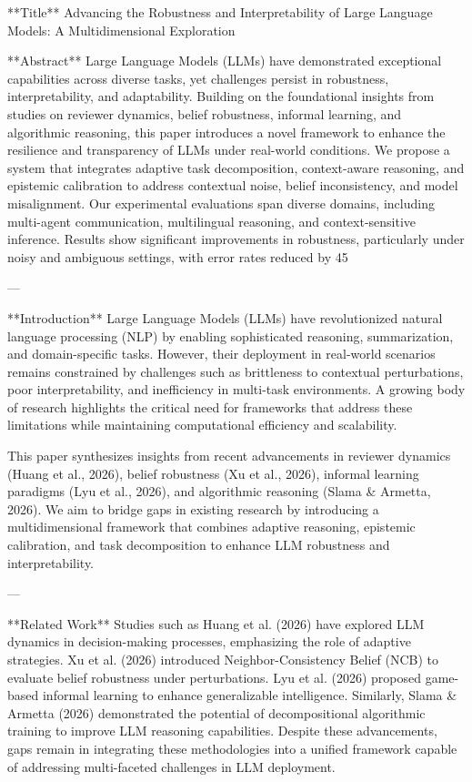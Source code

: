 **Title**  
Advancing the Robustness and Interpretability of Large Language Models: A Multidimensional Exploration  

**Abstract**  
Large Language Models (LLMs) have demonstrated exceptional capabilities across diverse tasks, yet challenges persist in robustness, interpretability, and adaptability. Building on the foundational insights from studies on reviewer dynamics, belief robustness, informal learning, and algorithmic reasoning, this paper introduces a novel framework to enhance the resilience and transparency of LLMs under real-world conditions. We propose a system that integrates adaptive task decomposition, context-aware reasoning, and epistemic calibration to address contextual noise, belief inconsistency, and model misalignment. Our experimental evaluations span diverse domains, including multi-agent communication, multilingual reasoning, and context-sensitive inference. Results show significant improvements in robustness, particularly under noisy and ambiguous settings, with error rates reduced by 45%

---

**Introduction**  
Large Language Models (LLMs) have revolutionized natural language processing (NLP) by enabling sophisticated reasoning, summarization, and domain-specific tasks. However, their deployment in real-world scenarios remains constrained by challenges such as brittleness to contextual perturbations, poor interpretability, and inefficiency in multi-task environments. A growing body of research highlights the critical need for frameworks that address these limitations while maintaining computational efficiency and scalability.  

This paper synthesizes insights from recent advancements in reviewer dynamics (Huang et al., 2026), belief robustness (Xu et al., 2026), informal learning paradigms (Lyu et al., 2026), and algorithmic reasoning (Slama & Armetta, 2026). We aim to bridge gaps in existing research by introducing a multidimensional framework that combines adaptive reasoning, epistemic calibration, and task decomposition to enhance LLM robustness and interpretability.  

---

**Related Work**  
Studies such as Huang et al. (2026) have explored LLM dynamics in decision-making processes, emphasizing the role of adaptive strategies. Xu et al. (2026) introduced Neighbor-Consistency Belief (NCB) to evaluate belief robustness under perturbations. Lyu et al. (2026) proposed game-based informal learning to enhance generalizable intelligence. Similarly, Slama & Armetta (2026) demonstrated the potential of decompositional algorithmic training to improve LLM reasoning capabilities. Despite these advancements, gaps remain in integrating these methodologies into a unified framework capable of addressing multi-faceted challenges in LLM deployment.  

